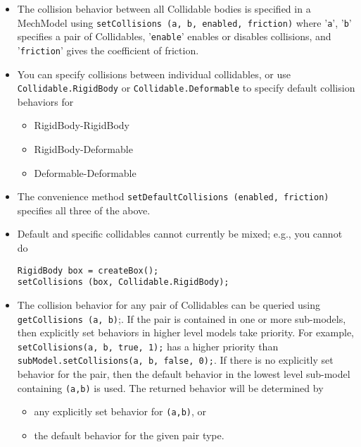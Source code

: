 \documentclass{article}
\begin{document}
\begin{itemize}

\item The collision behavior between all Collidable bodies is specified 
in a MechModel using {\tt setCollisions (a, b, enabled, friction)} where
'{\tt a}', '{\tt b}' specifies a pair of Collidables, '{\tt enable}' enables 
or disables collisions, and '{\tt friction}' gives the coefficient of 
friction.

\item You can specify collisions between individual collidables, or use 
{\tt Collidable.RigidBody} or {\tt Collidable.Deformable} to specify default
collision behaviors for 

\begin{itemize}

\item RigidBody-RigidBody

\item RigidBody-Deformable

\item Deformable-Deformable

\end{itemize}

\item The convenience method {\tt setDefaultCollisions (enabled, friction)} 
specifies all three of the above. 

\item Default and specific collidables cannot currently be mixed; e.g., 
you cannot do 
\begin{lstlisting}
RigidBody box = createBox();
setCollisions (box, Collidable.RigidBody);
\end{lstlisting}

\item The collision behavior for any pair of Collidables can be queried
using {\tt getCollisions (a, b)};. If the pair is contained in one or more 
sub-models, then explicitly set behaviors in higher level models take 
priority. For example, {\tt setCollisions(a, b, true, 1);} has a higher 
priority than {\tt subModel.setCollisions(a, b, false, 0);}. If there is
no explicitly set behavior for the pair, then the default behavior in 
the lowest level sub-model containing {\tt (a,b)} is used. The returned 
behavior will be determined by

\begin{itemize}

\item any explicitly set behavior for {\tt (a,b)}, or
\item the default behavior for the given pair type. 

\end{itemize}

\end{itemize}
\end{document}
